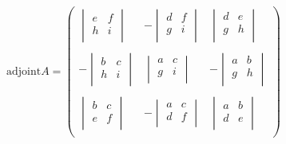 \documentclass[11pt,a4paper]{article}
\begin{document}
$$
\text{adjoint}A=
\begin{pmatrix}
\begin{vmatrix}
e & f\\
h & i\\
\end{vmatrix}
& -
\begin{vmatrix}
d & f\\
g & i\\
\end{vmatrix}
& 
\begin{vmatrix}
d & e\\
g & h\\
\end{vmatrix}\\\\
-
\begin{vmatrix}
b & c\\
h & i\\
\end{vmatrix}
&
\begin{vmatrix}
a & c\\
g & i\\
\end{vmatrix}
& -
\begin{vmatrix}
a & b\\
g & h\\
\end{vmatrix}\\\\
\begin{vmatrix}
b & c\\
e & f\\
\end{vmatrix}
& -
\begin{vmatrix}
a & c\\
d & f\\
\end{vmatrix}
&
\begin{vmatrix}
a & b\\
d & e\\
\end{vmatrix}\\
\end{pmatrix}
$$\\\\
\end{document}
